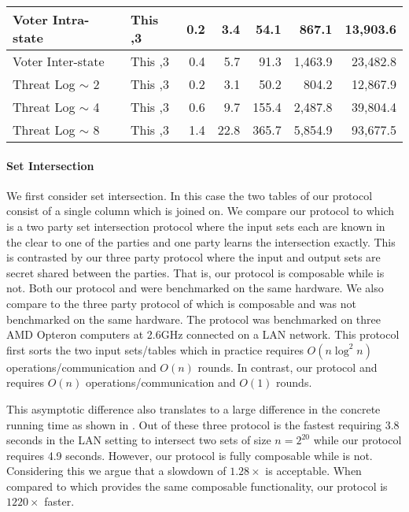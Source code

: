 \begin{figure*}[t!]
\begin{tabular}{|l |l|| r | r |r |r|r|}
		Voter Intra-state                 & This                           \hfill ,3        & 0.2   & 3.4      & 54.1     & 867.1    & 13,903.6 \\ \hline
		Voter Inter-state                 & This                           \hfill ,3        & 0.4   & 5.7      & 91.3     & 1,463.9  & 23,482.8 \\ \hline\hline
		Threat Log $\sim$ 2               & This                           \hfill ,3        & 0.2   & 3.1      & 50.2     & 804.2    & 12,867.9 \\ \hline
		Threat Log $\sim$ 4               & This                           \hfill ,3        & 0.6   & 9.7      & 155.4    & 2,487.8  & 39,804.4 \\ \hline
		Threat Log $\sim$ 8               & This                           \hfill ,3        & 1.4   & 22.8     & 365.7    & 5,854.9  & 93,677.5 \\ \hline
	\end{tabular}
	\caption{\label{fig:comm}	 }
\end{figure*}




\paragraph{Set Intersection} We first consider set intersection. In this case the two tables of our protocol consist of a single column which is joined on. We compare our protocol to \cite{CCS:KKRT16} which is a two party set intersection protocol where the input sets each are known in the clear to one of the parties and one party learns the intersection exactly. This is contrasted by our three party protocol where the input and output sets are secret shared between the parties. That is, our protocol is composable while \cite{CCS:KKRT16} is not. Both our protocol and \cite{CCS:KKRT16} were benchmarked on the same hardware. We also compare to the three party protocol of \cite{ASIACCS:BlaAgu12} which is composable and was not benchmarked on the same hardware. The \cite{ASIACCS:BlaAgu12} protocol was benchmarked on three AMD Opteron computers at 2.6GHz connected on a LAN network. This protocol first sorts the two input sets/tables which in practice requires $O(n\log^2 n)$ operations/communication and $O(n)$ rounds\cite{ASIACCS:BlaAgu12}. In contrast, our protocol and \cite{CCS:KKRT16} requires $O(n)$ operations/communication and $O(1)$ rounds. 

This asymptotic difference also translates to a large difference in the concrete running time as shown in . Out of these three protocol \cite{CCS:KKRT16} is the fastest requiring 3.8 seconds in the LAN setting to intersect two sets of size $n=2^{20}$ while our protocol requires 4.9 seconds. However, our protocol is fully composable while \cite{CCS:KKRT16} is not. Considering this we argue that a slowdown of $1.28\times$ is acceptable. When compared to \cite{ASIACCS:BlaAgu12} which provides the same composable functionality, our protocol is $1220\times$ faster.

